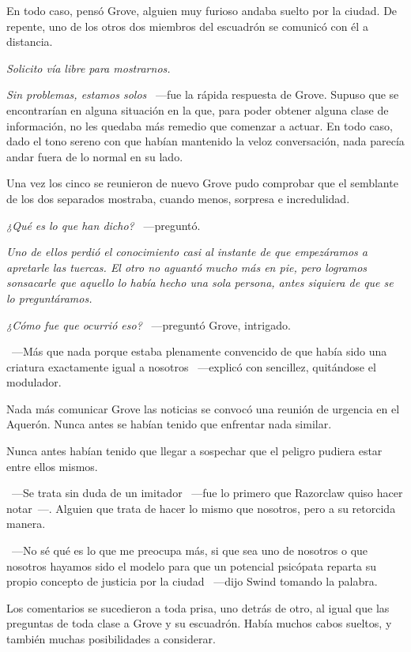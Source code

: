 En todo caso, pensó Grove, alguien muy furioso andaba suelto por la ciudad. De repente, uno de los otros dos miembros del escuadrón se comunicó con él a distancia.

\emph{Solicito vía libre para mostrarnos.}

\emph{Sin problemas, estamos solos} ~---fue la rápida respuesta de Grove. Supuso que se encontrarían en alguna situación en la que, para poder obtener alguna clase de información, no les quedaba más remedio que comenzar a actuar. En todo caso, dado el tono sereno con que habían mantenido la veloz conversación, nada parecía andar fuera de lo normal en su lado.

Una vez los cinco se reunieron de nuevo Grove pudo comprobar que el semblante de los dos separados mostraba, cuando menos, sorpresa e incredulidad.

\emph{¿Qué es lo que han dicho?} ~---preguntó.

\emph{Uno de ellos perdió el conocimiento casi al instante de que empezáramos a apretarle las tuercas. El otro no aguantó mucho más en pie, pero logramos sonsacarle que aquello lo había hecho una sola persona, antes siquiera de que se lo preguntáramos.}

\emph{¿Cómo fue que ocurrió eso?} ~---preguntó Grove, intrigado.

~---Más que nada porque estaba plenamente convencido de que había sido una criatura exactamente igual a nosotros ~---explicó con sencillez, quitándose el modulador.

\parbreak
Nada más comunicar Grove las noticias se convocó una reunión de urgencia en el Aquerón. Nunca antes se habían tenido que enfrentar nada similar.

Nunca antes habían tenido que llegar a sospechar que el peligro pudiera estar entre ellos mismos.

~---Se trata sin duda de un imitador ~---fue lo primero que Razorclaw quiso hacer notar~---. Alguien que trata de hacer lo mismo que nosotros, pero a su retorcida manera.

~---No sé qué es lo que me preocupa más, si que sea uno de nosotros o que nosotros hayamos sido el modelo para que un potencial psicópata reparta su propio concepto de justicia por la ciudad ~---dijo Swind tomando la palabra.

Los comentarios se sucedieron a toda prisa, uno detrás de otro, al igual que las preguntas de toda clase a Grove y su escuadrón. Había muchos cabos sueltos, y también muchas posibilidades a considerar.

